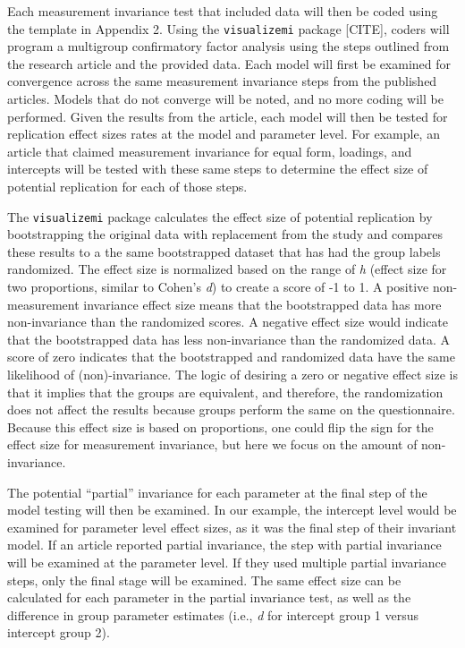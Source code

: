 \documentclass[
  man]{apa7}
\begin{document}
Each measurement invariance test that included data will then be coded using the template in Appendix 2. Using the \texttt{visualizemi} package {[}CITE{]}, coders will program a multigroup confirmatory factor analysis using the steps outlined from the research article and the provided data. Each model will first be examined for convergence across the same measurement invariance steps from the published articles. Models that do not converge will be noted, and no more coding will be performed. Given the results from the article, each model will then be tested for replication effect sizes rates at the model and parameter level. For example, an article that claimed measurement invariance for equal form, loadings, and intercepts will be tested with these same steps to determine the effect size of potential replication for each of those steps.

The \texttt{visualizemi} package calculates the effect size of potential replication by bootstrapping the original data with replacement from the study and compares these results to a the same bootstrapped dataset that has had the group labels randomized. The effect size is normalized based on the range of \emph{h} (effect size for two proportions, similar to Cohen's \emph{d}) to create a score of -1 to 1. A positive non-measurement invariance effect size means that the bootstrapped data has more non-invariance than the randomized scores. A negative effect size would indicate that the bootstrapped data has less non-invariance than the randomized data. A score of zero indicates that the bootstrapped and randomized data have the same likelihood of (non)-invariance. The logic of desiring a zero or negative effect size is that it implies that the groups are equivalent, and therefore, the randomization does not affect the results because groups perform the same on the questionnaire. Because this effect size is based on proportions, one could flip the sign for the effect size for measurement invariance, but here we focus on the amount of non-invariance.

The potential ``partial'' invariance for each parameter at the final step of the model testing will then be examined. In our example, the intercept level would be examined for parameter level effect sizes, as it was the final step of their invariant model. If an article reported partial invariance, the step with partial invariance will be examined at the parameter level. If they used multiple partial invariance steps, only the final stage will be examined. The same effect size can be calculated for each parameter in the partial invariance test, as well as the difference in group parameter estimates (i.e., \emph{d} for intercept group 1 versus intercept group 2).
\end{document}
